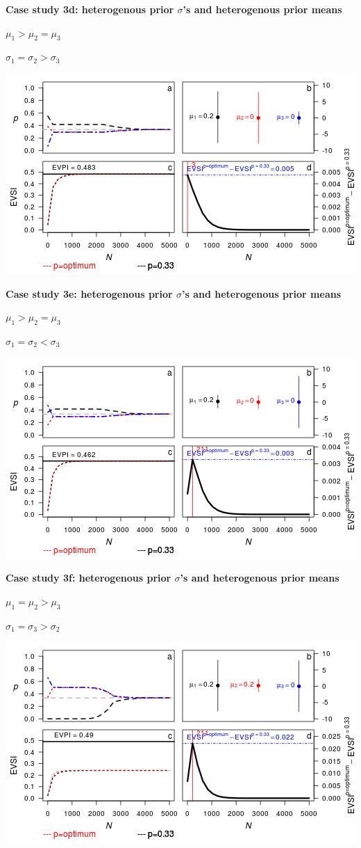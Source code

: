 \textbf{Case study 3d: heterogenous prior \(\sigma\)'s and heterogenous
prior means}

\(\mu_1 > \mu_2 = \mu_3\)

\(\sigma_1 = \sigma_2 > \sigma_3\)

\includegraphics{figure/x100__1__1_1c-1.png} \clearpage

\textbf{Case study 3e: heterogenous prior \(\sigma\)'s and heterogenous
prior means}

\(\mu_1 > \mu_2 = \mu_3\)

\(\sigma_1 = \sigma_2 < \sigma_3\)

\includegraphics{figure/x100_1_1__1c-1.png} \clearpage

\textbf{Case study 3f: heterogenous prior \(\sigma\)'s and heterogenous
prior means}

\(\mu_1 = \mu_2 > \mu_3\)

\(\sigma_1 = \sigma_3 > \sigma_2\)

\includegraphics{figure/x110__1_1__1c-1.png} \clearpage

